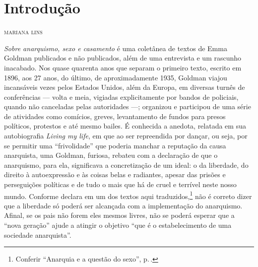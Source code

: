 \newcommand{\subtitulo}[1]{\NoCaseChange{\textnormal{\break\Large\itshape#1}}}
\chapter*{Introdução\smallskip\subtitulo{A \textit{suma sacerdotisa} do anarquismo}}


\begin{flushright}
\textsc{mariana lins}
\end{flushright}\bigskip

\noindent\textit{Sobre anarquismo, sexo e casamento} é uma coletânea de
textos de Emma Goldman publicados e não publicados, além de uma entrevista e um rascunho
inacabado. Nos quase quarenta anos que separam o primeiro texto, escrito em 1896, aos 27 anos, do último, de
aproximadamente 1935, Goldman viajou incansáveis vezes pelos Estados
Unidos, além da Europa, em diversas turnês de conferências --- volta e
meia, vigiadas explicitamente por bandos de policiais, quando não
canceladas pelas autoridades ---; organizou e participou de uma série de
atividades como comícios, greves, levantamento de fundos para presos
políticos, protestos e até mesmo bailes. É conhecida a anedota, relatada
em sua autobiografia \textit{Living my life}, em que ao ser repreendida
por dançar, ou seja, por se permitir uma ``frivolidade'' que poderia
manchar a reputação da causa anarquista, uma Goldman, furiosa, rebateu
com a declaração de que o anarquismo, para ela, significava a
concretização de um ideal: o da liberdade, do direito à
autoexpressão e às coisas belas e radiantes, apesar das prisões e
perseguições políticas e de tudo o mais que há de cruel e terrível neste
nosso mundo. Conforme declara em um dos textos aqui traduzidos,\footnote{Conferir ``Anarquia e a questão do sexo'', p.\,\pageref{ref1}.}
não é correto dizer que a
liberdade só poderá ser alcançada com a implementação do anarquismo.
Afinal, se os pais não forem eles mesmos livres, não se poderá esperar
que a ``nova geração'' ajude a atingir o objetivo ``que é o
estabelecimento de uma sociedade anarquista''.


